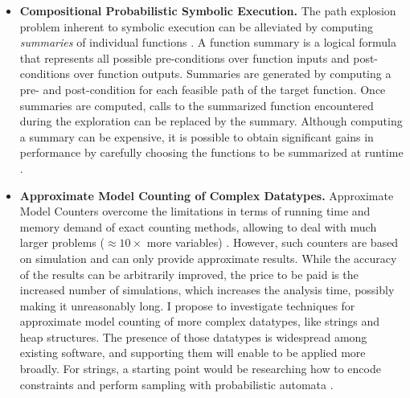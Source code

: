 \documentclass[10pt]{article}
\newcounter{list}
\begin{document}
\begin{itemize}
\item \textbf{Compositional Probabilistic Symbolic Execution.} The
path explosion problem inherent to symbolic execution can be
alleviated by computing \textit{summaries} of individual functions
\cite{godefroid2007compositional}. A function summary is a logical
formula that represents all possible pre-conditions over function
inputs and post-conditions over function outputs. Summaries are
generated by computing a pre- and post-condition for each feasible
path of the target function. Once summaries are computed, calls to the
summarized function encountered during the exploration can be replaced
by the summary. Although computing a summary can be expensive, it is
possible to obtain significant gains in performance by carefully
choosing the functions to be summarized at runtime
\cite{anand2008demand}.

\item \textbf{Approximate Model Counting of Complex Datatypes.}
Approximate Model Counters overcome the limitations in terms of
running time and memory demand of exact counting methods, allowing to
deal with much larger problems ($\approx 10\times$ more variables)
\cite{biere2009handbook}.  However, such counters are based on
simulation and can only provide approximate results. While the
accuracy of the results can be arbitrarily improved, the price to be
paid is the increased number of simulations, which increases the
analysis time, possibly making it unreasonably long. I propose to
investigate techniques for approximate model counting of more complex
datatypes, like strings and heap structures. The presence of those
datatypes is widespread among existing software, and supporting them
will enable \PSE{} to be applied more broadly. For strings, a starting
point would be researching how to encode constraints and perform
sampling with probabilistic automata \cite{vidal2005probabilistic}.





\end{itemize}
\end{document}
